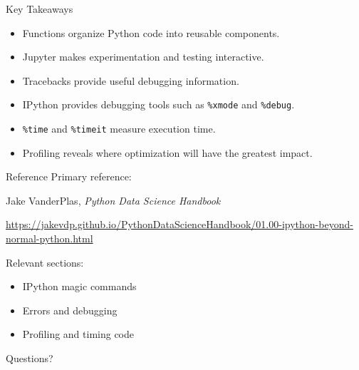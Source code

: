 \documentclass[aspectratio=169]{beamer}
\begin{document}
\begin{frame}{Key Takeaways}
\begin{itemize}
    \item Functions organize Python code into reusable components.
    \item Jupyter makes experimentation and testing interactive.
    \item Tracebacks provide useful debugging information.
    \item IPython provides debugging tools such as \texttt{\%xmode}
          and \texttt{\%debug}.
    \item \texttt{\%time} and \texttt{\%timeit} measure execution time.
    \item Profiling reveals where optimization will have the greatest impact.
\end{itemize}
\end{frame}

\begin{frame}{Reference}
Primary reference:

\vspace{0.3cm}

Jake VanderPlas, \textit{Python Data Science Handbook}

\vspace{0.2cm}

\url{https://jakevdp.github.io/PythonDataScienceHandbook/01.00-ipython-beyond-normal-python.html}

\vspace{0.4cm}

Relevant sections:
\begin{itemize}
    \item IPython magic commands
    \item Errors and debugging
    \item Profiling and timing code
\end{itemize}
\end{frame}

\begin{frame}
\centering
\Huge Questions?
\end{frame}
\end{document}
